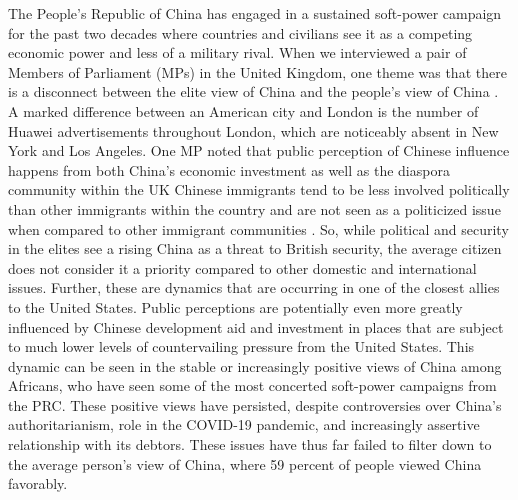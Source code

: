 {	The People's Republic of China has engaged in a sustained soft-power campaign for the past two decades where countries and civilians see it as a competing economic power and less of a military rival. When we interviewed a pair of Members of Parliament (MPs) in the United Kingdom, one theme was that there is a disconnect between the elite view of China and the people's view of China \cite{mpone20190717,mptwo20190717}. A marked difference between an American city and London is the number of Huawei advertisements throughout London, which are noticeably absent in New York and Los Angeles. One MP noted that public perception of Chinese influence happens from both China's economic investment as well as the diaspora community within the UK Chinese immigrants tend to be less involved politically than other immigrants within the country and are not seen as a politicized issue when compared to other immigrant communities \cite{mptwo20190717}. So, while political and security in the elites see a rising China as a threat to British security, the average citizen does not consider it a priority compared to other domestic and international issues. Further, these are dynamics that are occurring in one of the closest allies to the United States. Public perceptions are potentially even more greatly influenced by Chinese development aid and investment in places that are subject to much lower levels of countervailing pressure from the United States. This dynamic can be seen in the stable or increasingly positive views of China among Africans, who have seen some of the most concerted soft-power campaigns from the PRC. These positive views have persisted, despite controversies over China's authoritarianism, role in the COVID-19 pandemic, and increasingly assertive relationship with its debtors. These issues have thus far failed to filter down to the average person's view of China, where 59 percent of people viewed China favorably\cite{afrobarometer2020}. 
	
}
